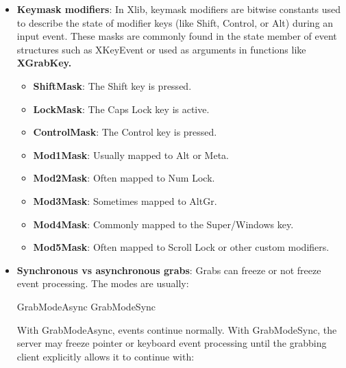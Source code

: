 \documentclass{report}
\begin{document}
\begin{itemize}
\begin{itemize}
            \end{itemize}
            \bigbreak \noindent 
            This is how a window manager can say:
            \begin{center}
                "\textit{When Mod1 + Button1 is pressed over this window, give me control.}"
            \end{center}
            \bigbreak \noindent 
            The grab becomes active only when the specified key/button/modifier combination occurs.
        \item \textbf{Keymask modifiers}: In Xlib, keymask modifiers are bitwise constants used to describe the state of modifier keys (like Shift, Control, or Alt) during an input event. These masks are commonly found in the state member of event structures such as XKeyEvent or used as arguments in functions like \textbf{XGrabKey.}
            \begin{itemize}
                \item \textbf{ShiftMask}: The Shift key is pressed.
                \item \textbf{LockMask}: The Caps Lock key is active.
                \item \textbf{ControlMask}: The Control key is pressed.
                \item \textbf{Mod1Mask}: Usually mapped to Alt or Meta.
                \item \textbf{Mod2Mask}: Often mapped to Num Lock.
                \item \textbf{Mod3Mask}: Sometimes mapped to AltGr.
                \item \textbf{Mod4Mask}: Commonly mapped to the Super/Windows key.
                \item \textbf{Mod5Mask}: Often mapped to Scroll Lock or other custom modifiers.
            \end{itemize}
        \item \textbf{Synchronous vs asynchronous grabs}: Grabs can freeze or not freeze event processing. The modes are usually:
            \bigbreak \noindent 
            \begin{cppcode}
            GrabModeAsync
            GrabModeSync
            \end{cppcode}
            \bigbreak \noindent 
            With GrabModeAsync, events continue normally. With GrabModeSync, the server may freeze pointer or keyboard event processing until the grabbing client explicitly allows it to continue with:
            \bigbreak \noindent 
            \begin{cppcode}

\end{cppcode}
\end{itemize}
\end{document}
